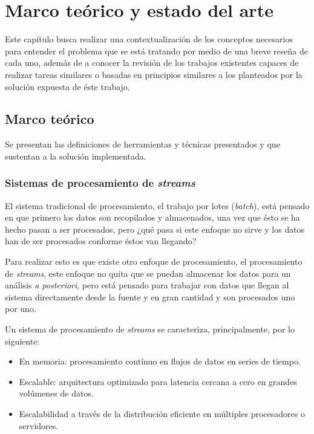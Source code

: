 \chapter{Marco teórico y estado del arte}
\label{cap:MarcTeorico}

Este capítulo busca realizar una contextualización de los conceptos necesarios para entender el problema que se está tratando por medio de una breve reseña de cada uno, además de a conocer la revisión de los trabajos existentes capaces de realizar tareas similares o basadas en principios similares a los planteados por la solución expuesta de éste trabajo.

\section{Marco teórico}
\label{intro:motivacion:marco}

Se presentan las definiciones de herramientas y técnicas presentados y que sustentan a la solución implementada.

\subsection{Sistemas de procesamiento de \textit{streams}}
\label{subsec:SPS}

El sistema tradicional de procesamiento, el trabajo por lotes (\textit{batch}), está pensado en que primero los datos son recopilados y almacenados, una vez que ésto se ha hecho pasan a ser procesados, pero ¿qué pasa si este enfoque no sirve y los datos han de ser procesados conforme éstos van llegando? 

Para realizar esto es que existe otro enfoque de procesamiento, el procesamiento de \textit{streams}, este enfoque no quita que se puedan almacenar los datos para un análisis \textit{a posteriori}, pero está pensado para trabajar con datos que llegan al sistema directamente desde la fuente y en gran cantidad y son procesados uno por uno.

Un sistema de procesamiento de \textit{streams} se caracteriza, principalmente, por lo siguiente:

\begin{itemize}
\item En memoria: procesamiento contínuo en flujos de datos en series de tiempo.
\item Escalable: arquitectura optimizado para latencia cercana a cero en grandes volúmenes de datos.
\item Escalabilidad a través de la distribución eficiente en múltiples procesadores o servidores.
\end{itemize}

